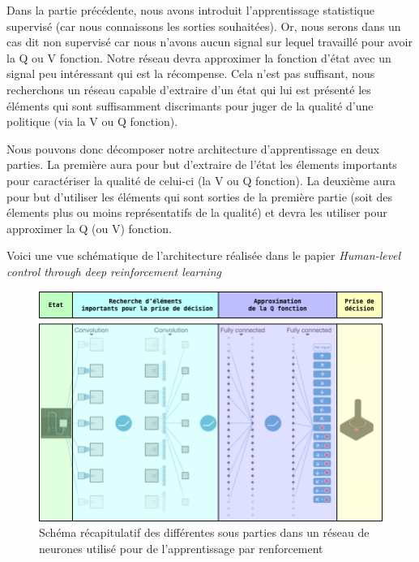 Dans la partie précédente, nous avons introduit l'apprentissage statistique supervisé (car nous connaissons les sorties souhaitées). Or, nous serons dans un cas dit non supervisé car nous n'avons aucun signal sur lequel travaillé pour avoir la Q ou V fonction. Notre réseau devra approximer la fonction d'état avec un signal peu intéressant qui est la récompense. Cela n'est pas suffisant, nous recherchons un réseau capable d'extraire d'un état qui lui est présenté les éléments qui sont suffisamment discrimants pour juger de la qualité d'une politique (via la V ou Q fonction).


Nous pouvons donc décomposer notre architecture d'apprentissage en deux parties. La première aura pour but d'extraire de l'état les élements importants pour caractériser la qualité de celui-ci (la V ou Q fonction). La deuxième aura pour but d'utiliser les éléments qui sont sorties de la première partie (soit des élements plus ou moins représentatifs de la qualité) et devra les utiliser pour approximer la Q (ou V) fonction.


Voici une vue schématique de l'architecture réalisée dans le papier \emph{Human-level control through deep reinforcement learning}\cite{mnih-dqn-2015}
\begin{figure}
\begin{center}
    \includegraphics[scale=.5]{./assets/DeepLearning/DP_EX.png}
    \caption{Schéma récapitulatif des différentes sous parties dans un réseau de neurones utilisé pour de l'apprentissage par renforcement}
\end{center}
\end{figure}

